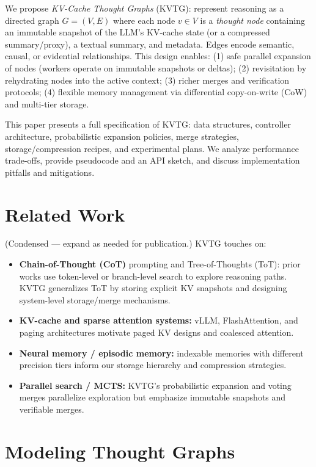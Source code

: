 \documentclass[11pt,onecolumn,letterpaper]{article}
\begin{document}
We propose \emph{KV-Cache Thought Graphs} (KVTG): represent reasoning as a directed graph \(G=(V,E)\) where each node \(v\in V\) is a \emph{thought node} containing an immutable snapshot of the LLM's KV-cache state (or a compressed summary/proxy), a textual summary, and metadata. Edges encode semantic, causal, or evidential relationships. This design enables: (1) safe parallel expansion of nodes (workers operate on immutable snapshots or deltas); (2) revisitation by rehydrating nodes into the active context; (3) richer merges and verification protocols; (4) flexible memory management via differential copy-on-write (CoW) and multi-tier storage.

This paper presents a full specification of KVTG: data structures, controller architecture, probabilistic expansion policies, merge strategies, storage/compression recipes, and experimental plans. We analyze performance trade-offs, provide pseudocode and an API sketch, and discuss implementation pitfalls and mitigations.

\section{Related Work}
(Condensed — expand as needed for publication.) KVTG touches on:
\begin{itemize}[nosep]
  \item \textbf{Chain-of-Thought (CoT)} prompting and Tree-of-Thoughts (ToT): prior works use token-level or branch-level search to explore reasoning paths. KVTG generalizes ToT by storing explicit KV snapshots and designing system-level storage/merge mechanisms.
  \item \textbf{KV-cache and sparse attention systems:} vLLM, FlashAttention, and paging architectures motivate paged KV designs and coalesced attention.
  \item \textbf{Neural memory / episodic memory:} indexable memories with different precision tiers inform our storage hierarchy and compression strategies.
  \item \textbf{Parallel search / MCTS:} KVTG's probabilistic expansion and voting merges parallelize exploration but emphasize immutable snapshots and verifiable merges.
\end{itemize}

\section{Modeling Thought Graphs}
\end{document}
